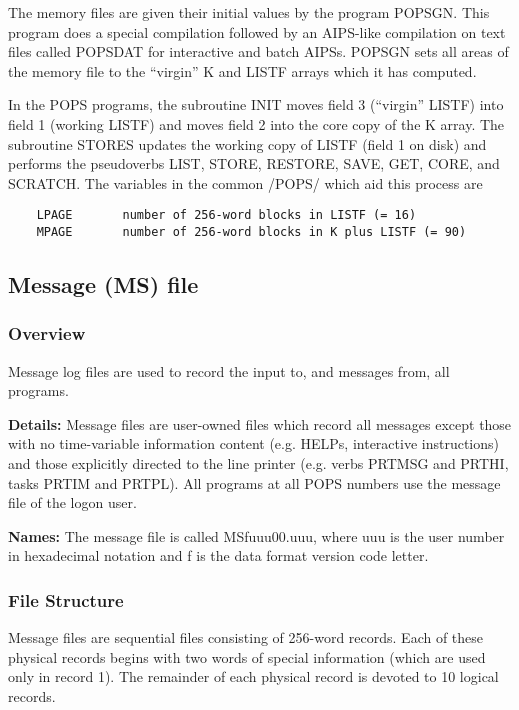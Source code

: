      The memory files are given their initial values by the program
POPSGN.  This program does a special compilation followed by an
AIPS-like compilation on text files called POPSDAT for interactive and
batch AIPSs.  POPSGN sets all areas of the memory file to the
``virgin'' K and LISTF arrays which it has computed.

     In the POPS programs, the subroutine INIT moves field 3 (``virgin''
LISTF) into field 1 (working LISTF) and moves field 2 into the core
copy of the K array.  The subroutine STORES updates the working copy of
LISTF (field 1 on disk) and performs the pseudoverbs LIST, STORE,
RESTORE, SAVE, GET, CORE, and SCRATCH.  The variables in the common
/POPS/ which aid this process are

\begin{verbatim}
    LPAGE       number of 256-word blocks in LISTF (= 16)
    MPAGE       number of 256-word blocks in K plus LISTF (= 90)
\end{verbatim}

\subsection{Message (MS) file}
\subsubsection{Overview}


  Message log files are used to record the input to, and
messages from, all programs.

{\bf Details:}  Message files are user-owned files which record all messages
except those with no time-variable information content (e.g. HELPs,
interactive instructions) and those explicitly directed to the line
printer (e.g. verbs PRTMSG and PRTHI, tasks PRTIM and PRTPL).  All
programs at all POPS numbers use the message file of the logon user.

{\bf Names:}  The message file is called MSfuuu00.uuu, where uuu is the user
number in hexadecimal notation and f is the data format version code letter.

\subsubsection{File Structure}

     Message files are sequential files consisting of 256-word records.
Each of these physical records begins with two words of special
information (which are used only in record 1).  The remainder of each
physical record is devoted to 10 logical records.

